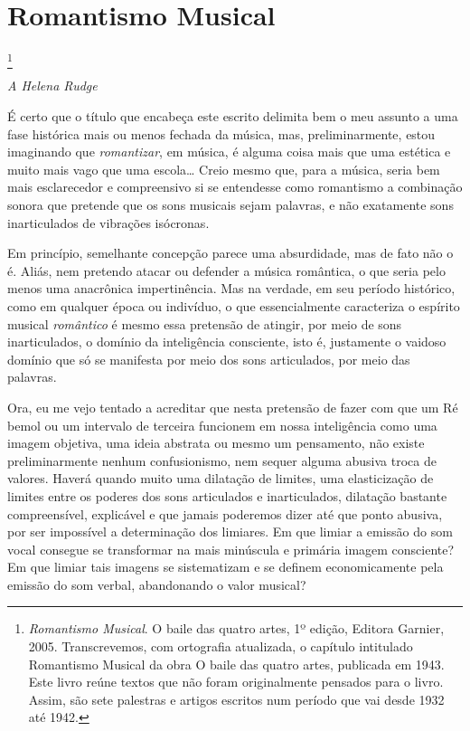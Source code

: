 \chapter{Romantismo Musical}\footnote{\textit{Romantismo Musical}. O baile das quatro artes, 1º edição, Editora Garnier, 2005. Transcrevemos, com ortografia atualizada, o capítulo intitulado Romantismo Musical da obra O baile das quatro artes, publicada em 1943. Este livro reúne textos que não foram originalmente pensados para o livro. Assim, são sete palestras e artigos escritos num período que vai desde 1932 até 1942.}


\begin{flushright}
\textit{A Helena Rudge}
\end{flushright}

\noindent{}É certo que o título que encabeça este escrito delimita bem o meu
assunto a uma fase histórica mais ou menos fechada da música, mas,
preliminarmente, estou imaginando que \textit{romantizar}, em música, é
alguma coisa mais que uma estética e muito mais vago que uma escola\ldots{}
Creio mesmo que, para a música, seria bem mais esclarecedor e
compreensivo si se entendesse como romantismo a combinação sonora que
pretende que os sons musicais sejam palavras, e não exatamente sons
inarticulados de vibrações isócronas.

Em princípio, semelhante concepção parece uma absurdidade, mas de fato
não o é. Aliás, nem pretendo atacar ou defender a música romântica, o
que seria pelo menos uma anacrônica impertinência. Mas na verdade, em
seu período histórico, como em qualquer época ou indivíduo, o que
essencialmente caracteriza o espírito musical \textit{romântico} é mesmo essa
pretensão de atingir, por meio de sons inarticulados, o domínio da
inteligência consciente, isto é, justamente o vaidoso domínio que só se
manifesta por meio dos sons articulados, por meio das palavras.

Ora, eu me vejo tentado a acreditar que nesta pretensão de fazer com que
um Ré bemol ou um intervalo de terceira funcionem em nossa inteligência
como uma imagem objetiva, uma ideia abstrata ou mesmo um pensamento, não
existe preliminarmente nenhum confusionismo, nem sequer alguma abusiva
troca de valores. Haverá quando muito uma dilatação de limites, uma
elasticização de limites entre os poderes dos sons articulados e
inarticulados, dilatação bastante compreensível, explicável e que jamais
poderemos dizer até que ponto abusiva, por ser impossível a determinação
dos limiares. Em que limiar a emissão do som vocal consegue se
transformar na mais minúscula e primária imagem consciente? Em que
limiar tais imagens se sistematizam e se definem economicamente pela
emissão do som verbal, abandonando o valor musical?

